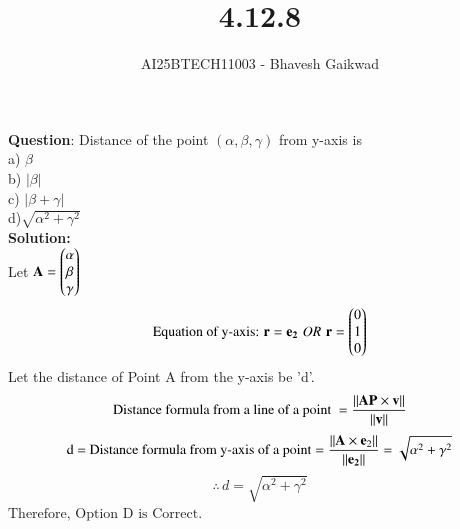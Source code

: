 \documentclass[journal]{IEEEtran}
\begin{document}

\vspace{3cm}

\title{4.12.8}
\author{AI25BTECH11003 - Bhavesh Gaikwad}
{\let\newpage\relax\maketitle}

\renewcommand{\thefigure}{\theenumi}
\renewcommand{\thetable}{\theenumi}
\setlength{\intextsep}{10pt} 


\renewcommand{\thetable}{\theenumi}


\textbf{Question}: Distance of the point $(\alpha, \beta, \gamma)$ from y-axis is\\
a) $\beta$\\
b) $|\beta|$\\
c) $|\beta + \gamma|$\\
d)$\sqrt{\alpha^2 + \gamma^2}$ \\

\textbf{Solution:}\\
Let $\mathbf{A} = \begin{pmatrix}\alpha \\ \beta \\ \gamma\end{pmatrix}$
\begin{equation}
    \text{Equation of y-axis: } \mathbf{r} = \mathbf{e_2} \, \,
    OR \, \, \mathbf{r}=\begin{pmatrix}0 \\ 1 \\ 0\end{pmatrix}
\end{equation}
Let the distance of Point A from the y-axis be 'd'.
\begin{equation}
    \text{Distance formula from a line of a point } = \dfrac{\left\lVert\mathbf{AP}\times\mathbf{v}\right\rVert}{\left\lVert\mathbf{v}\right\rVert}
\end{equation}
\begin{equation}
    \text{d = Distance formula from y-axis of a point} = \dfrac{\left\lVert\mathbf{A}\times\mathbf{e}_2\right\rVert}{\left\lVert\mathbf{e_2}\right\rVert}=\sqrt{\alpha^2 + \gamma^2} 
\end{equation}
\begin{equation}
\therefore \, d = \sqrt{\alpha^2 + \gamma^2}    
\end{equation}
$\boxed{\text{Therefore, Option D is Correct.}}$


\newpage
\end{document}
